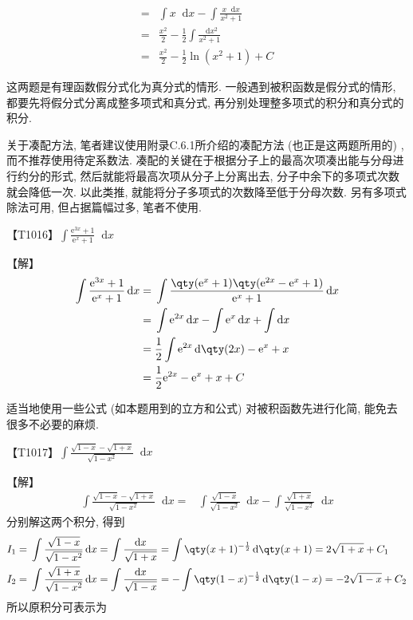 \documentclass{ctexbook}
\newcommand{\e}{\mathrm{e}}
\newcommand*{\dif}{\mathop{}\!\mathrm{d}}
\begin{document}
{\begin{align*}
={}&\int x\dif{x}-\int\frac{x\dif{x}}{x^{2}+1}\\
={}&\frac{x^{2}}{2}-\frac{1}{2}\int\frac{\dif{x^{2}}}{x^{2}+1}\\
={}&\frac{x^{2}}{2}-\frac{1}{2}\ln(x^{2}+1)+C
\end{align*}\par
{\kaishu 这两题是有理函数假分式化为真分式的情形. 一般遇到被积函数是假分式的情形, 都要先将假分式分离成整多项式和真分式, 再分别处理整多项式的积分和真分式的积分. \par
关于凑配方法, 笔者建议使用附录C.6.1所介绍的凑配方法 (也正是这两题所用的) , 而不推荐使用待定系数法. 凑配的关键在于根据分子上的最高次项凑出能与分母进行约分的形式, 然后就能将最高次项从分子上分离出去, 分子中余下的多项式次数就会降低一次. 以此类推, 就能将分子多项式的次数降至低于分母次数. 另有多项式除法可用, 但占据篇幅过多, 笔者不使用. \par}
{\color{red}【T1016】}$\int\frac{\e^{3x}+1}{\e^{x}+1}\dif{x}$\par
【解】
\begin{align*}
\int\frac{\e^{3x}+1}{\e^{x}+1}\dif{x}={}&\int\frac{\qty(\e^{x}+1)\qty(\e^{2x}-\e^{x}+1)}{\e^{x}+1}\dif{x}\\
={}&\int\e^{2x}\dif{x}-\int\e^{x}\dif{x}+\int\dif{x}\\
={}&\frac{1}{2}\int\e^{2x}\dif{\qty(2x)}-\e^{x}+x\\
={}&\frac{1}{2}\e^{2x}-\e^{x}+x+C
\end{align*}\par
{\kaishu 适当地使用一些公式 (如本题用到的立方和公式) 对被积函数先进行化简, 能免去很多不必要的麻烦. \par}
{\color{red}【T1017】}$\int\frac{\sqrt{1-x}-\sqrt{1+x}}{\sqrt{1-x^{2}}}\dif{x}$\par
【解】
\begin{align*}
\int\frac{\sqrt{1-x}-\sqrt{1+x}}{\sqrt{1-x^{2}}}\dif{x}={}&\int\frac{\sqrt{1-x}}{\sqrt{1-x^{2}}}\dif{x}-\int\frac{\sqrt{1+x}}{\sqrt{1-x^{2}}}\dif{x}
\end{align*}
分别解这两个积分, 得到
\begin{align*}
I_{1}={}&\int\frac{\sqrt{1-x}}{\sqrt{1-x^{2}}}\dif{x}=\int\frac{\dif{x}}{\sqrt{1+x}}=\int\qty(x+1)^{-\frac{1}{2}}\dif{\qty(x+1)}=2\sqrt{1+x}+C_{1}\\
I_{2}={}&\int\frac{\sqrt{1+x}}{\sqrt{1-x^{2}}}\dif{x}=\int\frac{\dif{x}}{\sqrt{1-x}}=-\int\qty(1-x)^{-\frac{1}{2}}\dif{\qty(1-x)}=-2\sqrt{1-x}+C_{2}
\end{align*}
所以原积分可表示为
\begin{align*}

\end{align*}}
\end{document}
